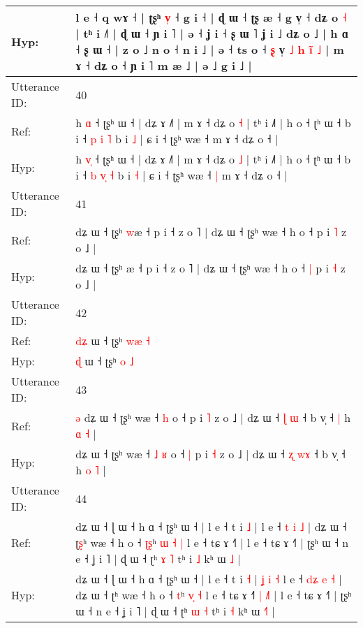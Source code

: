 \documentclass[10pt]{article}
\DeclareRobustCommand{\hl}[1]{{\textcolor{red}{#1}}}
\begin{document}
\begin{longtable}{ll}
 \\
Hyp: & l e ˧ q\hl{} wɤ ˧ | ʈʂʰ \hl{v}\hl{̩} ˧ g i ˧\hl{} | ɖ ɯ ˧ ʈʂ æ ˧ g v̩ ˧ dʑ o \hl{˧} | tʰ i ˩˥ | ɖ ɯ ˧ ɲ i ˥ | ə ˧ ʝ i ˧ ʂ ɯ ˥ ʝ i ˩ dʑ o ˩ | h ɑ ˧ \hl{}ʂ\hl{} ɯ ˧ | z o ˩ n o ˧ n i ˩ | ə ˧ ts o ˧ \hl{ʂ} v̩\hl{ }\hl{˩} \hl{h} \hl{i}\hl{̃} \hl{˩} | m ɤ ˧ dʑ o ˧ ɲ i ˥ m æ ˩ | ə ˩ g i ˩ |
 \\
\midrule
Utterance ID: & 40 \\
Ref: & h \hl{}\hl{ɑ} ˧ ʈʂʰ ɯ ˧ | dʑ ɤ ˩˥ | m ɤ ˧ dʑ o \hl{˧} | tʰ i ˩˥ | h o ˧ ʈʰ ɯ ˧ b i ˧ \hl{p} \hl{}\hl{i} \hl{˥} b i \hl{˩} | ɕ i ˧ ʈʂʰ wæ ˧\hl{}\hl{} m ɤ ˧ dʑ o ˧ |
 \\
Hyp: & h \hl{v}\hl{̩} ˧ ʈʂʰ ɯ ˧ | dʑ ɤ ˩˥ | m ɤ ˧ dʑ o \hl{˩} | tʰ i ˩˥ | h o ˧ ʈʰ ɯ ˧ b i ˧ \hl{b} \hl{v}\hl{̩} \hl{˧} b i \hl{˧} | ɕ i ˧ ʈʂʰ wæ ˧\hl{ }\hl{|} m ɤ ˧ dʑ o ˧ |
 \\
\midrule
Utterance ID: & 41 \\
Ref: & dʑ ɯ ˧ ʈʂʰ \hl{w}æ ˧ p i ˧ z o ˥ | dʑ ɯ ˧ ʈʂʰ wæ ˧ h o ˧\hl{}\hl{} p i \hl{˥} z o ˩ |
 \\
Hyp: & dʑ ɯ ˧ ʈʂʰ \hl{}æ ˧ p i ˧ z o ˥ | dʑ ɯ ˧ ʈʂʰ wæ ˧ h o ˧\hl{ }\hl{|} p i \hl{˧} z o ˩ |
 \\
\midrule
Utterance ID: & 42 \\
Ref: & \hl{d}\hl{ʑ} ɯ ˧ ʈʂʰ \hl{w}\hl{æ} \hl{˧}
 \\
Hyp: & \hl{}\hl{ɖ} ɯ ˧ ʈʂʰ \hl{}\hl{o} \hl{˩}
 \\
\midrule
Utterance ID: & 43 \\
Ref: & \hl{ə}\hl{ }dʑ ɯ ˧ ʈʂʰ wæ ˧\hl{}\hl{} \hl{h} o ˧\hl{}\hl{} p i \hl{˥} z o ˩ | dʑ ɯ ˧ \hl{ɭ} \hl{}\hl{ɯ} ˧ b v̩ ˧\hl{ }\hl{|} h \hl{ɑ} \hl{˧} |
 \\
Hyp: & \hl{}\hl{}dʑ ɯ ˧ ʈʂʰ wæ ˧\hl{ }\hl{˩} \hl{ʁ} o ˧\hl{ }\hl{|} p i \hl{˧} z o ˩ | dʑ ɯ ˧ \hl{ʐ} \hl{w}\hl{ɤ} ˧ b v̩ ˧\hl{}\hl{} h \hl{o} \hl{˥} |
 \\
\midrule
Utterance ID: & 44 \\
Ref: & dʑ ɯ ˧ ɭ ɯ ˧ h ɑ ˧ ʈʂʰ ɯ ˧ | l e ˧ t i \hl{˩} |\hl{}\hl{}\hl{}\hl{}\hl{}\hl{} l e ˧ \hl{}\hl{t} \hl{i} \hl{˩} | dʑ ɯ ˧ ʈ\hl{ʂ}ʰ wæ ˧ h o ˧ \hl{ʈ}\hl{ʂ}ʰ \hl{ɯ}\hl{ }\hl{˧} \hl{|} l e ˧ tɕ ɤ ˧\hl{}\hl{}\hl{}\hl{}\hl{}˥ | l e ˧ tɕ ɤ ˧˥ | ʈʂʰ ɯ ˧ n e ˧ ʝ i ˥ | ɖ ɯ ˧ ʈʰ \hl{ɤ} \hl{˥} tʰ i \hl{˩} kʰ ɯ \hl{}\hl{˩} |
 \\
Hyp: & dʑ ɯ ˧ ɭ ɯ ˧ h ɑ ˧ ʈʂʰ ɯ ˧ | l e ˧ t i \hl{˧} |\hl{ }\hl{ʝ}\hl{ }\hl{i}\hl{ }\hl{˧} l e ˧ \hl{d}\hl{ʑ} \hl{e} \hl{˧} | dʑ ɯ ˧ ʈ\hl{}ʰ wæ ˧ h o ˧ \hl{}\hl{t}ʰ \hl{}\hl{v}\hl{̩} \hl{˧} l e ˧ tɕ ɤ ˧\hl{˥}\hl{ }\hl{|}\hl{ }\hl{˩}˥ | l e ˧ tɕ ɤ ˧˥ | ʈʂʰ ɯ ˧ n e ˧ ʝ i ˥ | ɖ ɯ ˧ ʈʰ \hl{ɯ} \hl{˧} tʰ i \hl{˧} kʰ ɯ \hl{˧}\hl{˥} |

\end{longtable}
\end{document}
